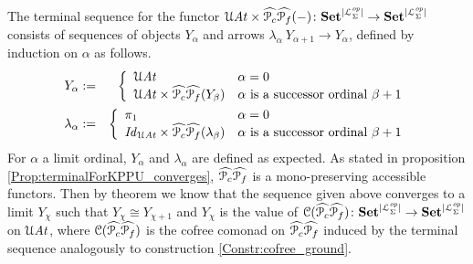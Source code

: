 \begin{construction}\label{Constr:cofree_PP} The terminal sequence for the functor $\mathcal{U}\mathit{At} \times \widehat{\mathcal P _c}\widehat{\mathcal P _f} (-) \colon \mathbf{Set}^{|\mathcal{L}^{\mathit{op}}_{\Sigma}|} \to \mathbf{Set}^{|\mathcal{L}^{\mathit{op}}_{\Sigma}|}$ consists of sequences of objects $Y_{\alpha}$ and arrows $\lambda_{\alpha}\: Y_{\alpha+1} \to Y_{\alpha}$, defined by induction on $\alpha$ as follows.
\begin{eqnarray*}
   Y_{\alpha} &:=& \left\{
	\begin{array}{ll}
        \mathcal{U}\mathit{At} & \alpha = 0 \\
		\mathcal{U}\mathit{At} \times \widehat{\mathcal P _c}\widehat{\mathcal P _f} (Y_{\beta}) & \alpha \mbox{ is a successor ordinal } \beta +1
	\end{array}
\right.\\
  \lambda_{\alpha} &:=& \left\{
	\begin{array}{ll}
        \pi_1 & \alpha = 0 \\
		\mathit{Id}_{\mathcal{U}\mathit{At}} \times \widehat{\mathcal P _c}\widehat{\mathcal P _f} (\lambda_{\beta}) & \alpha \mbox{ is a successor ordinal } \beta +1
	\end{array}
\right.\\
 \end{eqnarray*}
For $\alpha$ a limit ordinal, $Y_{\alpha}$ and $\lambda_{\alpha}$ are defined as expected. As stated in proposition \ref{Prop:terminalForKPPU_converges}, $\widehat{\mathcal P _c}\widehat{\mathcal P _f}$ is a mono-preserving accessible functors. Then by theorem \cite[Th. 7]{Worrell99} we know that the sequence given above converges to a limit $Y_{\chi}$ such that $Y_{\chi} \cong Y_{\chi+1}$ and $Y_{\chi}$ is the value of $\mathcal{C}(\widehat{\mathcal P _c}\widehat{\mathcal P _f})\colon \mathbf{Set}^{|\mathcal{L}^{\mathit{op}}_{\Sigma}|} \to \mathbf{Set}^{|\mathcal{L}^{\mathit{op}}_{\Sigma}|}$ on $\mathcal{U}\mathit{At}$, where $\mathcal{C}(\widehat{\mathcal P _c}\widehat{\mathcal P _f})$ is the cofree comonad on $\widehat{\mathcal P _c}\widehat{\mathcal P _f}$ induced by the terminal sequence analogously to construction \ref{Constr:cofree_ground}.
\end{construction}

